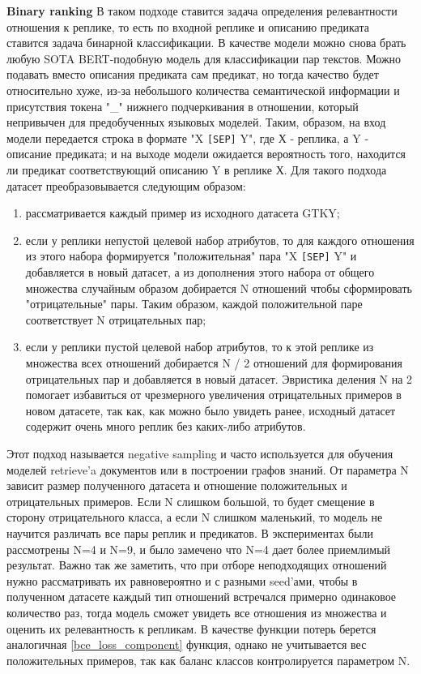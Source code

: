 \textbf{Binary ranking} В таком подходе ставится задача определения релевантности отношения к реплике, то есть по входной реплике и описанию предиката ставится задача бинарной классификации. В качестве модели можно снова брать любую SOTA BERT-подобную модель для классификации пар текстов. Можно подавать вместо описания предиката сам предикат, но тогда качество будет относительно хуже, из-за небольшого количества семантической информации и присутствия токена "\_" нижнего подчеркивания в отношении, который непривычен для предобученных языковых моделей. Таким, образом, на вход модели передается строка в формате "X \texttt{[SEP]} Y", где Х - реплика, а Y - описание предиката; и на выходе модели ожидается вероятность того, находится ли предикат соответствующий описанию Y в реплике Х. Для такого подхода датасет преобразовывается следующим образом: 
\begin{enumerate}
    \item рассматривается каждый пример из исходного датасета GTKY;
    \item если у реплики непустой целевой набор атрибутов, то для каждого отношения из этого набора формируется "положительная" пара "X \texttt{[SEP]} Y" и добавляется в новый датасет, а из дополнения этого набора от общего множества случайным образом добирается N отношений чтобы сформировать "отрицательные" пары. Таким образом, каждой положительной паре соответствует N отрицательных пар;
    \item если у реплики пустой целевой набор атрибутов, то к этой реплике из множества всех отношений добирается N / 2 отношений для формирования отрицательных пар и добавляется в новый датасет. Эвристика деления N на 2 помогает избавиться от чрезмерного увеличения отрицательных примеров в новом датасете, так как, как можно было увидеть ранее, исходный датасет содержит очень много реплик без каких-либо атрибутов.
\end{enumerate}
Этот подход называется negative sampling и часто используется для обучения моделей retrieve'a документов или в построении графов знаний. От параметра N зависит размер полученного датасета и отношение положительных и отрицательных примеров. Если N слишком большой, то будет смещение в сторону отрицательного класса, а если N слишком маленький, то модель не научится различать все пары реплик и предикатов. В экспериментах были рассмотрены N=4 и N=9, и было замечено что N=4 дает более приемлимый результат. Важно так же заметить, что при отборе неподходящих отношений нужно рассматривать их равновероятно и с разными seed'ами, чтобы в полученном датасете каждый тип отношений встречался примерно одинаковое количество раз, тогда модель сможет увидеть все отношения из множества и оценить их релевантность к репликам. В качестве функции потерь берется аналогичная \ref{bce_loss_component} функция, однако не учитывается вес положительных примеров, так как баланс классов контролируется параметром N.

